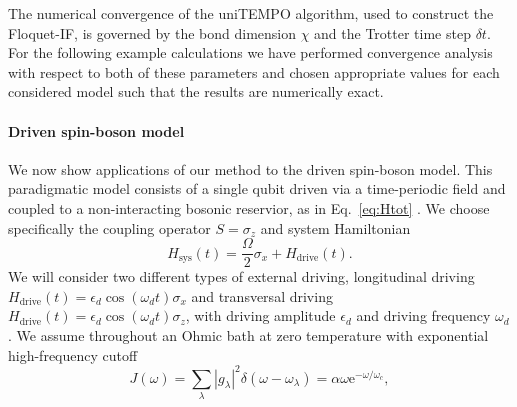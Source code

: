 \documentclass[aps,prb, twocolumn,superscriptaddress]{revtex4-2}
\begin{document}
The numerical convergence of the uniTEMPO algorithm, used to construct the Floquet-IF, is governed by the bond dimension $\chi$ and the Trotter time step $\delta t$. For the following example calculations we have performed convergence analysis with respect to both of these parameters and chosen appropriate values for each considered model such that the results are numerically exact.

\paragraph*{Driven spin-boson model}

We now show applications of our method to the driven spin-boson model. This paradigmatic model consists of a single qubit driven via a time-periodic field and coupled to a non-interacting bosonic reservior, as in Eq.~\eqref{eq:Htot} \cite{Koski2018Jul,vonHorstig2024Jul,ivakhnenko2025Probing}.
We choose specifically the coupling operator $S=\sigma_z$ and system Hamiltonian
\begin{equation}
    H_\mathrm{sys}(t)=\frac{\Omega}{2}\sigma_x+H_\mathrm{drive}(t).
\end{equation}
We will consider two different types of external driving, longitudinal driving $H_\mathrm{drive}(t) = \epsilon_d\cos(\omega_d t)\sigma_x$ and transversal driving $H_\mathrm{drive}(t) = \epsilon_d\cos(\omega_dt)\sigma_z$, with driving amplitude $\epsilon_d$ and driving frequency $\omega_d$. We assume throughout an Ohmic bath at zero temperature with exponential high-frequency cutoff
\begin{equation} \label{sd}
    J(\omega) = \sum_\lambda |g_\lambda|^2\delta(\omega-\omega_\lambda)=\alpha\omega\mathrm{e}^{-\omega/\omega_c},
\end{equation}
\end{document}
